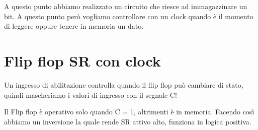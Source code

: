 



A questo punto abbiamo realizzato un circuito che riesce ad immagazzinare un bit. A questo punto però vogliamo controllare con un clock quando è il momento di leggere oppure tenere in memoria un dato.

\newpage
\section{Flip flop SR con clock}

Un ingresso di abilitazione controlla quando il flip flop può cambiare di stato, quindi mascheriamo i valori di ingresso con il segnale C!

Il Flip flop è operativo solo quando C = 1, altrimenti è in memoria. Facendo così abbiamo un inversione la quale rende SR attivo alto, funziona in logica positiva.


